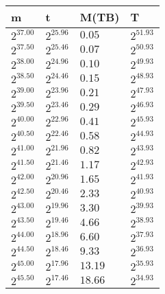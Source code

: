 \begin{tabular}{llll}
m & t & M(TB) & T \\ \hline
$2^{37.00}$ & $2^{25.96}$ & $0.05$ & $2^{51.93}$ \\
$2^{37.50}$ & $2^{25.46}$ & $0.07$ & $2^{50.93}$ \\
$2^{38.00}$ & $2^{24.96}$ & $0.10$ & $2^{49.93}$ \\
$2^{38.50}$ & $2^{24.46}$ & $0.15$ & $2^{48.93}$ \\
$2^{39.00}$ & $2^{23.96}$ & $0.21$ & $2^{47.93}$ \\
$2^{39.50}$ & $2^{23.46}$ & $0.29$ & $2^{46.93}$ \\
$2^{40.00}$ & $2^{22.96}$ & $0.41$ & $2^{45.93}$ \\
$2^{40.50}$ & $2^{22.46}$ & $0.58$ & $2^{44.93}$ \\
$2^{41.00}$ & $2^{21.96}$ & $0.82$ & $2^{43.93}$ \\
$2^{41.50}$ & $2^{21.46}$ & $1.17$ & $2^{42.93}$ \\
$2^{42.00}$ & $2^{20.96}$ & $1.65$ & $2^{41.93}$ \\
$2^{42.50}$ & $2^{20.46}$ & $2.33$ & $2^{40.93}$ \\
$2^{43.00}$ & $2^{19.96}$ & $3.30$ & $2^{39.93}$ \\
$2^{43.50}$ & $2^{19.46}$ & $4.66$ & $2^{38.93}$ \\
$2^{44.00}$ & $2^{18.96}$ & $6.60$ & $2^{37.93}$ \\
$2^{44.50}$ & $2^{18.46}$ & $9.33$ & $2^{36.93}$ \\
$2^{45.00}$ & $2^{17.96}$ & $13.19$ & $2^{35.93}$ \\
$2^{45.50}$ & $2^{17.46}$ & $18.66$ & $2^{34.93}$ \\
\end{tabular}
\\\\
\\\\
